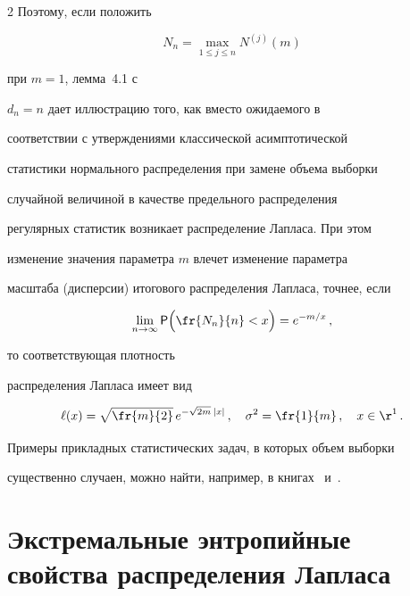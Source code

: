 \begin{multicols}{2}
Поэтому, если положить


$$


N_n=\max_{1\le j\le n}N^{(j)}(m)


$$


при $m=1$, лемма~4.1 с


$d_n=n$ дает иллюстрацию того, как вместо ожидаемого в


соответствии с утверждениями классической асимптотической


статистики нормального распределения при замене объема выборки


случайной величиной в качестве предельного распределения


регулярных статистик возникает распределение Лапласа. При этом


изменение значения параметра $m$ влечет изменение параметра


масштаба (дисперсии) итогового распределения Лапласа, точнее, если


\begin{equation}


\lim_{n\to\infty}{\sf P}\Big(\fr{N_n}{n}<x\Big)=


e^{-m/x}\,, \label{4.5b}


\end{equation}


то соответствующая плотность


распределения Лап\-ла\-са имеет вид


\begin{equation}


\ell(x)=\sqrt{\fr{m}{2}}\,e^{-\sqrt{2m}\:|x|}\,,\quad \sigma^2=\fr{1}{m}\,,


\quad x\in{\r}^1\,.


\label{4.6b}


\end{equation}





Примеры прикладных статистических задач, в которых объем выборки


существенно случаен, можно найти, например, в книгах~\cite{12be} и~\cite{3be}.





\section{Экстремальные энтропийные свойства распределения Лапласа}






\end{multicols}
